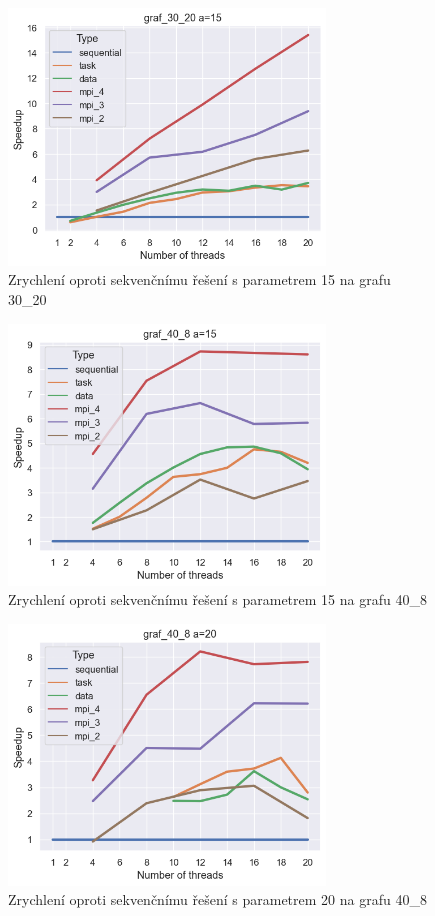 \documentclass[epsf,epic,eepic,eepicemu]{article}\oddsidemargin=-5mm
\begin{document}
\begin{figure}
\centering
\includegraphics[width=0.75\textwidth]{images/speedup_15__30_20}
\caption{Zrychlení oproti sekvenčnímu řešení s parametrem 15 na grafu 30\_20}
\label{fig:speedup_15__30_20}
\end{figure}
\begin{figure}
\centering
\includegraphics[width=0.75\textwidth]{images/speedup_15__40_8}
\caption{Zrychlení oproti sekvenčnímu řešení s parametrem 15 na grafu 40\_8}
\label{fig:speedup_15__40_8}
\end{figure}
\begin{figure}
\centering
\includegraphics[width=0.75\textwidth]{images/speedup_20__40_8}
\caption{Zrychlení oproti sekvenčnímu řešení s parametrem 20 na grafu 40\_8}
\label{fig:speedup_20__40_8}
\end{figure}
\end{document}
